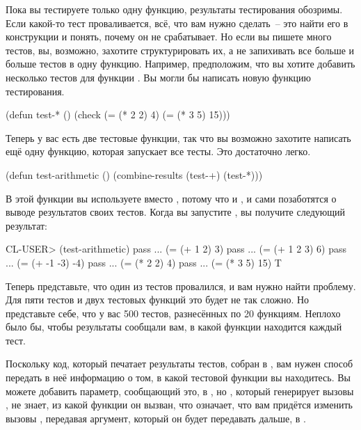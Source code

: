 Пока вы тестируете только одну функцию, результаты тестирования обозримы. Если какой-то
тест проваливается, всё, что вам нужно сделать~-- это найти его в конструкции 
и понять, почему он не срабатывает. Но если вы пишете много тестов, вы, возможно, захотите
структурировать их, а не запихивать все больше и больше тестов в одну функцию. Например,
предположим, что вы хотите добавить несколько тестов для функции \code{*}. Вы могли бы
написать новую функцию тестирования.

\begin{myverb}
(defun test-* ()
  (check
    (= (* 2 2) 4)
    (= (* 3 5) 15)))
\end{myverb}

Теперь у вас есть две тестовые функции, так что вы возможно захотите написать ещё одну
функцию, которая запускает все тесты. Это достаточно легко.

\begin{myverb}
(defun test-arithmetic ()
  (combine-results
   (test-+)
   (test-*)))
\end{myverb}

В этой функции вы используете  вместо , потому что и
, и  сами позаботятся о выводе результатов своих тестов. Когда
вы запустите , вы получите следующий результат:

\begin{myverb}
CL-USER> (test-arithmetic)
pass ... (= (+ 1 2) 3)
pass ... (= (+ 1 2 3) 6)
pass ... (= (+ -1 -3) -4)
pass ... (= (* 2 2) 4)
pass ... (= (* 3 5) 15)
T
\end{myverb}

Теперь представьте, что один из тестов провалился, и вам нужно найти проблему. Для пяти
тестов и двух тестовых функций это будет не так сложно. Но представьте себе, что у вас 500
тестов, разнесённых по 20 функциям. Неплохо было бы, чтобы результаты сообщали вам, в
какой функции находится каждый тест.

Поскольку код, который печатает результаты тестов, собран в , вам
нужен способ передать в неё информацию о том, в какой тестовой функции вы находитесь. Вы
можете добавить параметр, сообщающий это, в , но , который
генерирует вызовы , не знает, из какой функции он вызван, что
означает, что вам придётся изменить вызовы , передавая аргумент, который он
будет передавать дальше, в .

